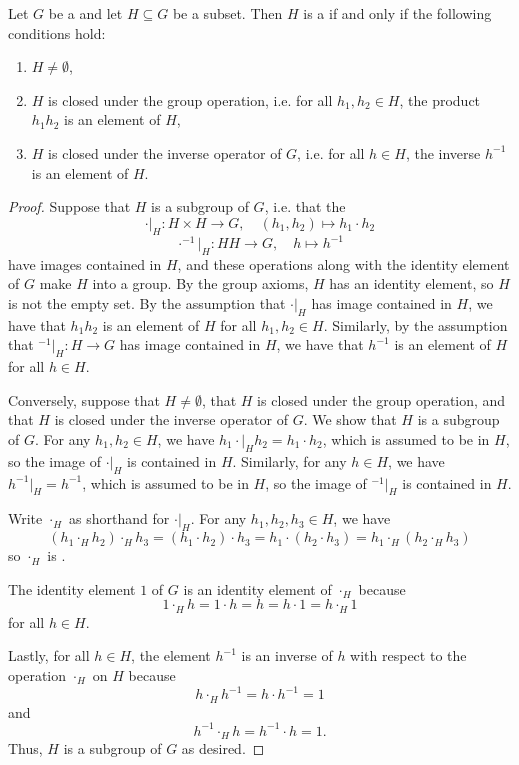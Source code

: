 \begin{proposition} \label{proposition:subgroup_criterion_for_a_subset_of_a_group}
    Let $G$ be a  and let $H \subseteq G$ be a subset. Then $H$ is a  if and only if the following conditions hold:
    \begin{enumerate}
        \item $H \neq \emptyset$,
        \item $H$ is closed under the group operation, i.e. for all $h_1, h_2 \in H$, the product $h_1 h_2$ is an element of $H$,
        \item $H$ is closed under the inverse operator of $G$, i.e. for all $h \in H$, the inverse $h^{-1}$ is an element of $H$.
    \end{enumerate}
\end{proposition}
\begin{proof}
    Suppose that $H$ is a subgroup of $G$, i.e. that the 
    $$\cdot|_H: H \times H \to G, \quad (h_1,h_2) \mapsto h_1 \cdot h_2$$
    $$\cdot^{-1}|_H: H H \to G, \quad h \mapsto h^{-1}$$
    have images contained in $H$, and these operations along with the identity element of $G$ make $H$ into a group. By the group axioms, $H$ has an identity element, so $H$ is not the empty set. By the assumption that $\cdot|_H$ has image contained in $H$, we have that $h_1h_2$ is an element of $H$ for all $h_1,h_2 \in H$. Similarly, by the assumption that ${}^{-1}|_H: H \to G$ has image contained in $H$, we have that $h^{-1}$ is an element of $H$ for all $h \in H$.

    Conversely, suppose that $H \neq \emptyset$, that $H$ is closed under the group operation, and that $H$ is closed under the inverse operator of $G$. We show that $H$ is a subgroup of $G$. For any $h_1,h_2 \in H$, we have $h_1 \cdot|_H h_2 = h_1 \cdot h_2$, which is assumed to be in $H$, so the image of $\cdot|_H$ is contained in $H$. Similarly, for any $h \in H$, we have $h^{-1}|_H = h^{-1}$, which is assumed to be in $H$, so the image of ${}^{-1}|_H$ is contained in $H$.

    Write $\cdot_H$ as shorthand for $\cdot|_H$. For any $h_1,h_2,h_3 \in H$, we have
    $$(h_1 \cdot_H h_2) \cdot_H h_3 = (h_1 \cdot h_2) \cdot h_3 = h_1 \cdot (h_2 \cdot h_3) = h_1 \cdot_H (h_2 \cdot_H h_3)$$
    so $\cdot_H$ is .

    The identity element $1$ of $G$ is an identity element of $\cdot_H$ because
    $$1 \cdot_H h = 1 \cdot h = h = h \cdot 1 = h \cdot_H 1$$
    for all $h \in H$.

    Lastly, for all $h \in H$, the element $h^{-1}$ is an inverse of $h$ with respect to the operation $\cdot_H$ on $H$ because
    $$h \cdot_H h^{-1} = h \cdot h^{-1} = 1$$
    and
    $$h^{-1} \cdot_H h = h^{-1} \cdot h = 1.$$
    Thus, $H$ is a subgroup of $G$ as desired.
\end{proof}
